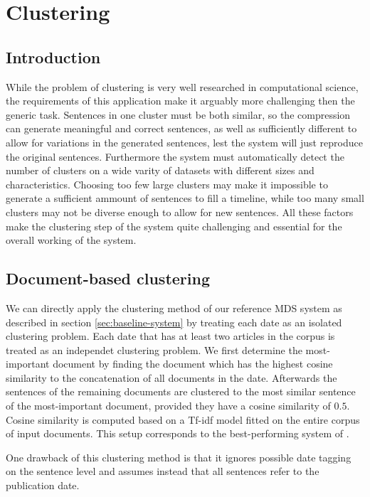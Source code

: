 \documentclass[a4paper,BCOR=10mm]{report}
\begin{document}
\section{Clustering}

\subsection{Introduction}

While the problem of clustering is very well researched in computational science, the requirements of this application make it arguably more challenging then the generic task. Sentences in one cluster must be both similar, so the compression can generate meaningful and correct sentences, as well as sufficiently different to allow for variations in the generated sentences, lest the system will just reproduce the original sentences.
Furthermore the system must automatically detect the number of clusters on a wide varity of datasets with different sizes and characteristics.
Choosing too few large clusters may make it impossible to generate a sufficient ammount of sentences to fill a timeline, while too many small clusters may not be diverse enough to allow for new sentences.
All these factors make the clustering step of the system quite challenging and essential for the overall working of the system.


\subsection{Document-based clustering}

We can directly apply the clustering method of our reference MDS system as described in section \ref{sec:baseline-system} by treating each date as an isolated clustering problem.
Each date that has at least two articles in the corpus is treated as an independet clustering problem.
We first determine the most-important document by finding the document which has the highest cosine similarity to the concatenation of all documents in the date.
Afterwards the sentences of the remaining documents are clustered to the most similar sentence of the most-important document, provided they have a cosine similarity of $0.5$. Cosine similarity is computed based on a Tf-idf model fitted on the entire corpus of input documents.
This setup corresponds to the best-performing system of \citet{banerjee}.

One drawback of this clustering method is that it ignores possible date tagging on the sentence level and assumes instead that all sentences refer to the publication date. 
\end{document}
